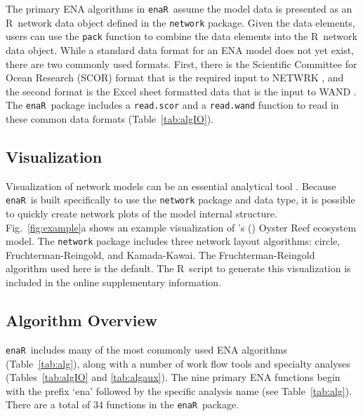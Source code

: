 \documentclass[11pt]{article}
\def\citeapos#1{\citeauthor{#1}'s (\citeyear{#1})}
\newcommand{\R}{R}
\newcommand{\enaR}{\texttt{enaR}}
\begin{document}
\begin{spacing}{2}
The primary ENA algorithms in \enaR\ assume the model data is
presented as an \R\ network data object defined in the
\texttt{network} package.  Given the data elements, users can use
the \texttt{pack} function to combine the data elements into the \R\
network data object. While a standard data format for an ENA model
does not yet exist, there are two commonly used formats.  First, there
is the Scientific Committee for Ocean Research (SCOR) format that is
the required input to NETWRK \citep{ulanowicz91}, and the second
format is the Excel sheet formatted data that is the input to WAND
\citep{allesina04_wand}.  The \enaR\ package includes a
\texttt{read.scor} and a \texttt{read.wand} function to read in these
common data formats (Table~\ref{tab:algIO}).

\subsection{Visualization}
Visualization of network models can be an essential analytical tool
\citep{moody05dynamic, lima2011visual}.  Because \enaR\ is built
specifically to use the \texttt{network} package and data type, it is possible to
quickly create network plots of the model internal structure.
Fig.~\ref{fig:example}a shows an example visualization of
\citeapos{dame81} Oyster Reef ecosystem model.  The \texttt{network}
package includes three network layout algorithms: circle,
Fruchterman-Reingold, and Kamada-Kawai.  The Fruchterman-Reingold
algorithm used here is the default.  The \R\ script to generate this
visualization is included in the online supplementary information.

\subsection{Algorithm Overview}
\enaR\ includes many of the most commonly used ENA algorithms
(Table~\ref{tab:alg}), along with a number of work flow tools and specialty
analyses (Tables~\ref{tab:algIO} and \ref{tab:algaux}).  The nine
primary ENA functions begin with the prefix `ena' followed by the
specific analysis name (see Table~\ref{tab:alg}).  There are a total
of 34 functions in the \enaR\ package.


\end{spacing}
\end{document}
